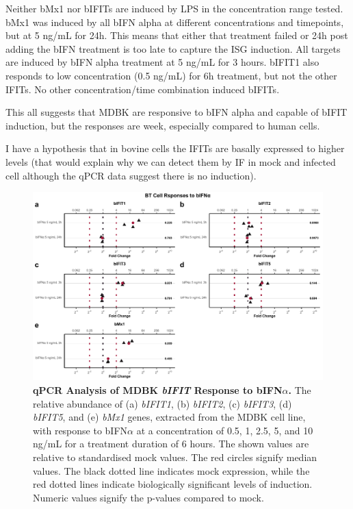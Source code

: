 Neither bMx1 nor bIFITs are induced by LPS in the concentration range tested. bMx1 was induced by all bIFN alpha at different concentrations and timepoints, but at 5 ng/mL for 24h. This means that either that treatment failed or 24h post adding the bIFN treatment is too late to capture the ISG induction. All targets are induced by bIFN alpha treatment at 5 ng/mL for 3 hours. bIFIT1 also responds to low concentration (0.5 ng/mL) for 6h treatment, but not the other IFITs. No other concentration/time combination induced bIFITs. 

This all suggests that MDBK are responsive to bIFN alpha and capable of bIFIT induction, but the responses are week, especially compared to human cells.

I have a hypothesis that in bovine cells the IFITs are basally expressed to higher levels  (that would explain why we can detect them by IF in mock and infected cell although the qPCR data suggest there is no induction).


\begin{figure}
    \centering
    \includegraphics[width=1\linewidth]{07. Chapter 2/Figs/02. Induction/08. bt_bifna.pdf}
    \caption[qPCR Analysis of BT \textit{bIFIT} Response to bIFN\(\alpha\).]{\textbf{qPCR Analysis of MDBK \textit{bIFIT} Response to bIFN\(\alpha\).} The relative abundance of (a) \textit{bIFIT1}, (b) \textit{bIFIT2}, (c) \textit{bIFIT3}, (d) \textit{bIFIT5}, and (e) \textit{bMx1} genes, extracted from the MDBK cell line, with response to bIFN\(\alpha\) at a concentration of 0.5, 1, 2.5, 5, and 10 ng/mL for a treatment duration of 6 hours. The shown values are relative to standardised mock values. The red circles signify median values. The black dotted line indicates mock expression, while the red dotted lines indicate biologically significant levels of induction. Numeric values signify the p-values compared to mock.}
    \label{BT responses to bifna}
\end{figure}


